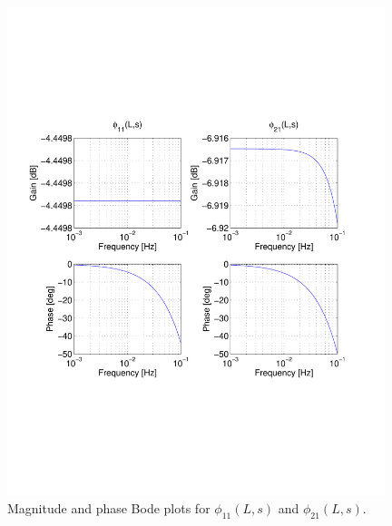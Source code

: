 \documentclass[preprint]{elsarticle}
\begin{document}
\begin{figure}[H]
\centering
\includegraphics[trim = 0mm 60mm 0mm 60mm, width = 110mm]{diagIOfreeflow}
\caption{Magnitude and phase Bode plots for $\phi_{11}(L,s)$ and $\phi_{21}(L,s)$.\label{fig:Magn_phase_diag}}
\end{figure}
\end{document}
